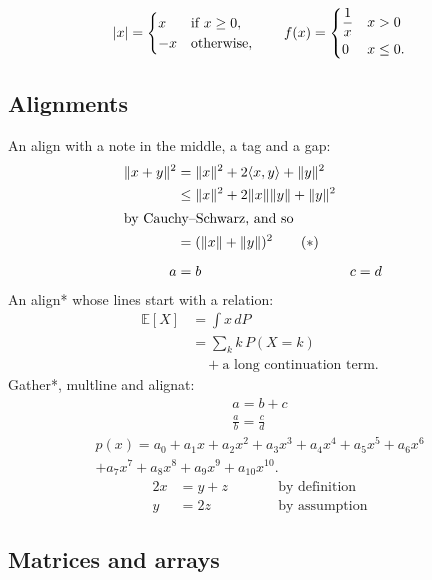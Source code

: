 \documentclass[11pt,letterpaper]{article}
\theoremstyle{definition}
\theoremstyle{remark}
\DeclarePairedDelimiter{\abs}{\lvert}{\rvert}
\DeclarePairedDelimiter{\norm}{\lVert}{\rVert}
\newcommand{\E}{\mathbb{E}}
\begin{document}
\[ \abs{x} = \begin{cases} x & \text{if } x \geq 0, \\ -x & \text{otherwise}, \end{cases} \qquad f(x) = \begin{dcases} \frac{1}{x} & x > 0 \\ 0 & x \leq 0. \end{dcases} \]

\subsection{Alignments}

An align with a note in the middle, a tag and a gap:
\begin{align}
    \norm{x + y}^2 &= \norm{x}^2 + 2\langle x, y \rangle + \norm{y}^2 \notag \\
                   &\leq \norm{x}^2 + 2\norm{x}\norm{y} + \norm{y}^2 \label{eq:cs} \\
    \intertext{by Cauchy--Schwarz, and so}
                   &= (\norm{x} + \norm{y})^2 \tag{$\ast$} \\[6pt]
    a &= b & c &= d
\end{align}
An align* whose lines start with a relation:
\begin{align*}
    \E[X] &= \int x\,dP \\
          &= \sum_{k} k \, P(X = k) \\
          &\quad + \text{a long continuation term}.
\end{align*}
Gather*, multline and alignat:
\begin{gather*}
    a = b + c \\
    \frac{a}{b} = \frac{c}{d}
\end{gather*}
\begin{multline}
    p(x) = a_0 + a_1 x + a_2 x^2 + a_3 x^3 + a_4 x^4 + a_5 x^5 + a_6 x^6 \\
    + a_7 x^7 + a_8 x^8 + a_9 x^9 + a_{10} x^{10}.
\end{multline}
\begin{alignat}{2}
    x &= y + z \qquad && \text{by definition} \\
    y &= 2z         && \text{by assumption}
\end{alignat}

\subsection{Matrices and arrays}
\end{document}
